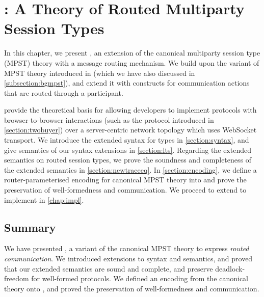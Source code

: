 \chapter{\newtheory: A Theory of
Routed Multiparty Session Types}
\label{chap:theory}

In this chapter, we present
\newtheory, an extension of the
canonical multiparty session type (MPST)
theory with a message routing mechanism.
We build upon the variant of MPST theory introduced
in \cite{LessIsMore}
(which we have also discussed in \cref{subsection:bgmpst}), 
and extend it
with constructs for communication actions
that are routed through a participant.

\newtheory provide the theoretical basis
for allowing developers to implement
protocols with browser-to-browser interactions
(such as the  protocol
introduced in \cref{section:twobuyer})
over a server-centric network topology
which uses WebSocket transport.
We introduce the extended syntax for types in 
\cref{section:syntax}, and give semantics of our
syntax extensions in \cref{section:lts}.
Regarding the extended semantics on routed session types,
we prove the soundness and completeness of
the extended semantics in \cref{section:newtraceeq}.
In \cref{section:encoding},
we define a router-parameterised encoding
for canonical MPST theory into \newtheory
and prove the preservation of well-formedness
and communication.
We proceed to extend \codegen to implement \newtheory
in \cref{chap:impl}.









\section{Summary}
We have presented \newtheory, a variant of
the canonical MPST theory to express \textit{routed communication}.
We introduced extensions to syntax and semantics, and proved
that our extended semantics are sound and complete,
and preserve deadlock-freedom
for well-formed protocols. 
We defined an encoding from the
canonical theory onto \newtheory, and proved the preservation
of well-formedness and communication.